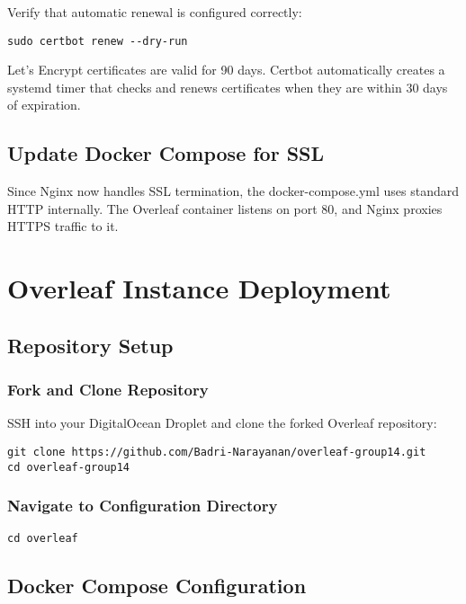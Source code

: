 Verify that automatic renewal is configured correctly:

\begin{verbatim}
sudo certbot renew --dry-run
\end{verbatim}

Let's Encrypt certificates are valid for 90 days. Certbot automatically creates a systemd timer that checks and renews certificates when they are within 30 days of expiration.

\subsection{Update Docker Compose for SSL}

Since Nginx now handles SSL termination, the docker-compose.yml uses standard HTTP internally. The Overleaf container listens on port 80, and Nginx proxies HTTPS traffic to it.

\section{Overleaf Instance Deployment}

\subsection{Repository Setup}

\subsubsection{Fork and Clone Repository}

SSH into your DigitalOcean Droplet and clone the forked Overleaf repository:

\begin{verbatim}
git clone https://github.com/Badri-Narayanan/overleaf-group14.git
cd overleaf-group14
\end{verbatim}

\subsubsection{Navigate to Configuration Directory}

\begin{verbatim}
cd overleaf
\end{verbatim}

\subsection{Docker Compose Configuration}


